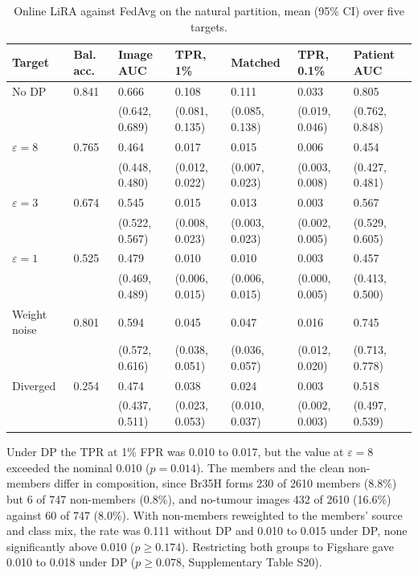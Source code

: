 \documentclass[preprint,12pt]{elsarticle}
\begin{document}
\begin{table}[htbp]
\caption{Online LiRA against FedAvg on the natural partition, mean (95\% CI) over five targets.}\label{tab:lira}
\footnotesize\setlength{\tabcolsep}{2pt}
\begin{tabular*}{\linewidth}{@{}p{1.6cm}@{\extracolsep{\fill}}llllll@{}}
\toprule
Target & Bal. acc. & Image AUC & TPR, 1\% & Matched & TPR, 0.1\% & Patient AUC\\
\midrule
No DP & 0.841 & 0.666 & 0.108 & 0.111 & 0.033 & 0.805\\
 &  & {\scriptsize (0.642, 0.689)} & {\scriptsize (0.081, 0.135)} & {\scriptsize (0.085, 0.138)} & {\scriptsize (0.019, 0.046)} & {\scriptsize (0.762, 0.848)}\\[2pt]
$\varepsilon=8$ & 0.765 & 0.464 & 0.017 & 0.015 & 0.006 & 0.454\\
 &  & {\scriptsize (0.448, 0.480)} & {\scriptsize (0.012, 0.022)} & {\scriptsize (0.007, 0.023)} & {\scriptsize (0.003, 0.008)} & {\scriptsize (0.427, 0.481)}\\[2pt]
$\varepsilon=3$ & 0.674 & 0.545 & 0.015 & 0.013 & 0.003 & 0.567\\
 &  & {\scriptsize (0.522, 0.567)} & {\scriptsize (0.008, 0.023)} & {\scriptsize (0.003, 0.023)} & {\scriptsize (0.002, 0.005)} & {\scriptsize (0.529, 0.605)}\\[2pt]
$\varepsilon=1$ & 0.525 & 0.479 & 0.010 & 0.010 & 0.003 & 0.457\\
 &  & {\scriptsize (0.469, 0.489)} & {\scriptsize (0.006, 0.015)} & {\scriptsize (0.006, 0.015)} & {\scriptsize (0.000, 0.005)} & {\scriptsize (0.413, 0.500)}\\[2pt]
Weight noise & 0.801 & 0.594 & 0.045 & 0.047 & 0.016 & 0.745\\
 &  & {\scriptsize (0.572, 0.616)} & {\scriptsize (0.038, 0.051)} & {\scriptsize (0.036, 0.057)} & {\scriptsize (0.012, 0.020)} & {\scriptsize (0.713, 0.778)}\\[2pt]
Diverged & 0.254 & 0.474 & 0.038 & 0.024 & 0.003 & 0.518\\
 &  & {\scriptsize (0.437, 0.511)} & {\scriptsize (0.023, 0.053)} & {\scriptsize (0.010, 0.037)} & {\scriptsize (0.002, 0.003)} & {\scriptsize (0.497, 0.539)}\\[2pt]
\bottomrule
\end{tabular*}
\end{table}

Under DP the TPR at 1\% FPR was 0.010 to 0.017, but the value at $\varepsilon=8$ exceeded the nominal 0.010
($p=0.014$). The members and the clean non-members differ in composition, since Br35H forms 230 of 2610 members
(8.8\%) but 6 of 747 non-members (0.8\%), and no-tumour images 432 of 2610 (16.6\%) against 60 of 747 (8.0\%). With
non-members reweighted to the members' source and class mix, the rate was 0.111 without DP and 0.010 to 0.015 under
DP, none significantly above 0.010 ($p\ge0.174$). Restricting both groups to Figshare gave 0.010 to 0.018 under DP
($p\ge0.078$, Supplementary Table S20).
\end{document}
